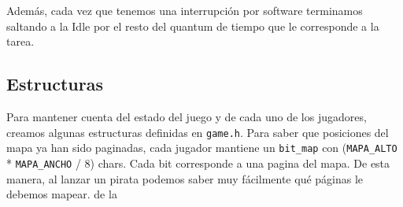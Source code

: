 Además, cada vez que tenemos una interrupción por software terminamos saltando a la Idle por el resto del quantum de tiempo que le corresponde a la tarea.

\subsection{Estructuras}

Para mantener cuenta del estado del juego y de cada uno de los jugadores, creamos algunas estructuras definidas en \texttt{game.h}. Para saber que posiciones del mapa ya han sido paginadas, cada jugador mantiene un \texttt{bit\_map} con (\texttt{MAPA\_ALTO} * \texttt{MAPA\_ANCHO} / 8) chars. Cada bit corresponde a una pagina del mapa. De esta manera, al lanzar un pirata podemos saber muy fácilmente qué páginas le debemos mapear.
 de la 